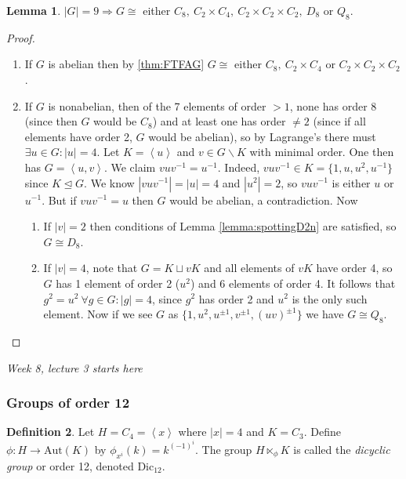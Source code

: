 \documentclass[a4paper]{article}
\newcommand{\la}{\left\langle}
\newcommand{\ra}{\right\rangle}
\newcommand{\Dic}{\text{Dic}}
\newcommand{\Aut}{\text{Aut}}
\theoremstyle{definition}
\newtheorem{defn}{Definition}[subsection]
\newtheorem{lemma}[defn]{Lemma}
\begin{document}
\begin{lemma}
$|G|=9\Rightarrow G\cong$ either $C_8,\ C_2\times C_4,\ C_2\times C_2\times C_2,\ D_8$ or $Q_8$.
\end{lemma}
\begin{proof}
\begin{enumerate}
\item If $G$ is abelian then by \ref{thm:FTFAG} $G\cong$ either $C_8,\ C_2\times C_4$ or $C_2\times C_2\times C_2$.
\item If $G$ is nonabelian, then of the 7 elements of order $>1$, none has order 8 (since then $G$ would be $C_8$) and at least one has order $\neq 2$ (since if all elements have order 2, $G$ would be abelian), so by Lagrange's there must $\exists u\in G:|u|=4$. Let $K=\la u\ra$ and $v\in G\backslash K$ with minimal order. One then has $G=\la u,v\ra$. We claim $vuv^{-1}=u^{-1}$. Indeed, $vuv^{-1}\in K=\{1,u,u^2,u^{-1}\}$ since $K\unlhd G$. We know $|vuv^{-1}|=|u|=4$ and $|u^2|=2$, so $vuv^{-1}$ is either $u$ or $u^{-1}$. But if $vuv^{-1}=u$ then $G$ would be abelian, a contradiction. Now
\begin{enumerate}
\item If $|v|=2$ then conditions of Lemma \ref{lemma:spottingD2n} are satisfied, so $G\cong D_8$.
\item If $|v|=4$, note that $G=K\sqcup vK$ and all elements of $vK$ have order 4, so $G$ has 1 element of order 2 ($u^2$) and 6 elements of order 4. It follows that $g^2=u^2 \ \forall g\in G:|g|=4$, since $g^2$ has order 2 and $u^2$ is the only such element. Now if we see $G$ as $\{1,u^2,u^{\pm 1},v^{\pm 1},(uv)^{\pm 1}\}$ we have $G\cong Q_8$.
\end{enumerate}
\end{enumerate}
\end{proof}

\begin{flushright}
\textit{Week 8, lecture 3 starts here}
\end{flushright}

\subsubsection{Groups of order 12}
\begin{defn}
\label{defn:dic}
Let $H=C_4=\la x\ra$ where $|x|=4$ and $K=C_3$. Define $\phi:H\rightarrow\Aut(K)$ by $\phi_{x^i}(k)=k^{(-1)^i}$. The group $H\ltimes_\phi K$ is called the \textit{dicyclic group} or order 12, denoted $\Dic_{12}$.
\end{defn}
\end{document}
